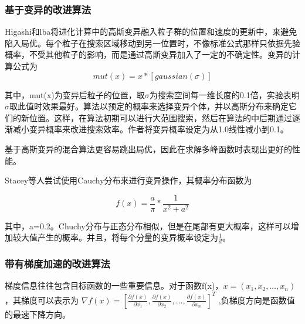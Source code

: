\subsubsection{基于变异的改进算法}
Higashi和lba将进化计算中的高斯变异融入粒子群的位置和速度的更新中\cite{Higashi2013Particle}，来避免陷入局优。每个粒子在搜索区域移动到另一位置时，不像标准公式那样只依据先验概率，不受其他粒子的影响，而是通过高斯变异加入了一定的不确定性。变异的计算公式为
\begin{equation}
mut(x)=x*[gaussian(\sigma)]
\end{equation}

其中，mut(x)为变异后粒子的位置，取$\sigma$为搜索空间每一维长度的0.1倍，实验表明$\sigma$取此值时效果最好。算法以预定的概率来选择变异个体，并以高斯分布来确定它们的新位置。这样，在算法初期可以进行大范围搜索，然后在算法的中后期通过逐渐减小变异概率来改进搜索效率。作者将变异概率设定为从1.0线性减小到0.1。

基于高斯变异的混合算法更容易跳出局优，因此在求解多峰函数时表现出更好的性能。

Stacey等人尝试使用Cauchy分布来进行变异操作\cite{Sahu2012Fast}，其概率分布函数为

\begin{equation}
f(x)=\frac{a}{\pi}*\frac{1}{x^2+a^2}
\end{equation}

其中，a=0.2。Chuchy分布与正态分布相似，但是在尾部有更大概率，这样可以增加较大值产生的概率。并且，将每个分量的变异概率设定为$\frac{1}{d}$。

\subsubsection{带有梯度加速的改进算法}
梯度信息往往包含目标函数的一些重要信息。对于函数f(x)，$x=(x_1,x_2,\ldots,x_n)$，其梯度可以表示为
$\nabla f(x)=[
\frac{\partial f(x)}{\partial x_1},
\frac{\partial f(x)}{\partial x_2},
\ldots,
\frac{\partial f(x)}{\partial x_n}]^T$
,负梯度方向是函数值的最速下降方向。

